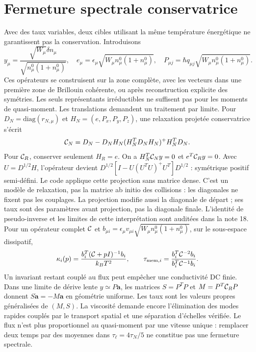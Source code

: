 \documentclass[11pt,a4paper]{article}
\begin{document}
\section{Fermeture spectrale conservatrice}
Avec des taux variables, deux cibles utilisant la même température énergétique ne garantissent pas la conservation. Introduisons
\[y_\mu=\frac{\sqrt{W_\mu}\delta n_\mu}{\sqrt{n_\mu^0(1+n_\mu^0)}},\quad e_\mu=\epsilon_\mu\sqrt{W_\mu n_\mu^0(1+n_\mu^0)},\quad P_{\mu j}=\hbar q_{\mu j}\sqrt{W_\mu n_\mu^0(1+n_\mu^0)}.\]
Ces opérateurs se construisent sur la zone complète, avec les vecteurs dans une première zone de Brillouin cohérente, ou après reconstruction explicite des symétries. Les seuls représentants irréductibles ne suffisent pas pour les moments de quasi-moment. Les translations demandent un traitement par limite. Pour $D_N=\mathrm{diag}(r_{N,\mu})$ et $H_N=(e,P_x,P_y,P_z)$, une relaxation projetée conservatrice s'écrit
\[{\cal C}_N=D_N-D_NH_N(H_N^TD_NH_N)^+H_N^TD_N.\]
Pour ${\cal C}_R$, conserver seulement $H_R=e$. On a $H_N^T{\cal C}_Ny=0$ et $e^T{\cal C}_Ry=0$. Avec $U=D^{1/2}H$, l'opérateur devient $D^{1/2}[I-U(U^TU)^+U^T]D^{1/2}$ : symétrique positif semi-défini. Le code applique cette projection sans matrice dense. C'est un modèle de relaxation, pas la matrice ab initio des collisions : les diagonales ne fixent pas les couplages. La projection modifie aussi la diagonale de départ ; ses taux sont des paramètres avant projection, pas la diagonale finale. L'identité de pseudo-inverse et les limites de cette interprétation sont auditées dans la note 18.
Pour un opérateur complet ${\cal C}$ et $b_{\mu i}=\epsilon_\mu v_{\mu i}\sqrt{W_\mu n_\mu^0(1+n_\mu^0)}$, sur le sous-espace dissipatif,
\[\kappa_i(p)=\frac{b_i^T({\cal C}+pI)^{-1}b_i}{k_BT^2},\qquad \tau_{{\rm mem},i}=\frac{b_i^T{\cal C}^{-2}b_i}{b_i^T{\cal C}^{-1}b_i}.\]
Un invariant restant couplé au flux peut empêcher une conductivité DC finie. Dans une limite de dérive lente $y\simeq P\mathbf a$, les matrices $S=P^TP$ et $M=P^T{\cal C}_RP$ donnent $S\dot{\mathbf a}=-M\mathbf a$ en géométrie uniforme. Les taux sont les valeurs propres généralisées de $(M,S)$.
La viscosité demande encore l'élimination des modes rapides couplés par le transport spatial et une séparation d'échelles vérifiée. Le flux n'est plus proportionnel au quasi-moment par une vitesse unique : remplacer deux temps par des moyennes dans $\tau_\ell=4\tau_N/5$ ne constitue pas une fermeture spectrale.
\end{document}
